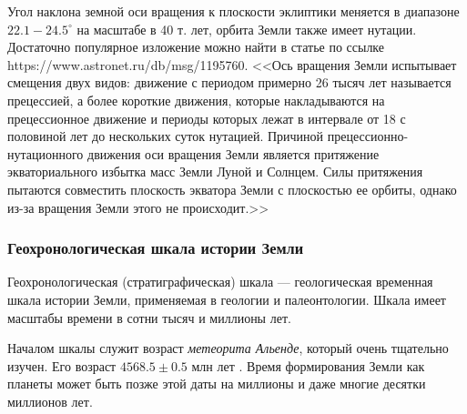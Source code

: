 \documentclass[a5paper,openany]{book}
\begin{document}
Угол наклона земной оси вращения к плоскости эклиптики меняется в диапазоне $22.1-24.5 ^{\circ}$ на масштабе в 40 т. лет, орбита Земли также имеет нутации. %
Достаточно популярное изложение можно найти в статье \cite{Decart2003} по ссылке https://www.astronet.ru/db/msg/1195760.
<<Ось вращения Земли испытывает смещения двух видов: движение с периодом примерно 26 тысяч лет называется прецессией, а более короткие движения, которые накладываются на прецессионное движение и периоды которых лежат в интервале от 18 с половиной лет до нескольких суток нутацией. Причиной прецессионно-нутационного движения оси вращения Земли является притяжение экваториального избытка масс Земли Луной и Солнцем. Силы притяжения пытаются совместить плоскость экватора Земли с плоскостью ее орбиты, однако из-за вращения Земли этого не происходит.>> 

	
	\subsubsection{Геохронологическая шкала истории Земли} \label{GeoTimeScales}

Геохронологическая (стратиграфическая) шкала  --- геологическая временная шкала истории Земли, применяемая в геологии и палеонтологии. 
Шкала имеет масштабы времени в сотни тысяч и миллионы лет. 

Началом шкалы служит возраст \emph{метеорита Альенде}, который очень тщательно изучен. Его возраст $ 4568.5 \pm 0.5 $ млн лет \cite{Allende2007}. 
Время формирования Земли как планеты может быть позже этой даты на миллионы и даже многие десятки миллионов лет.
\end{document}
